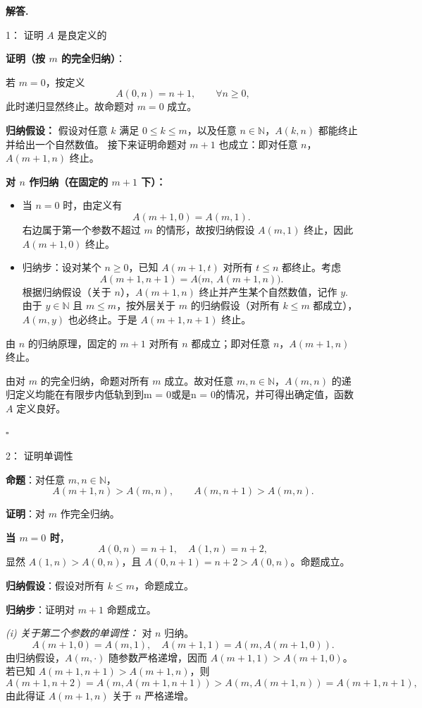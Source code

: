 \documentclass[12pt,a4paper,oneside]{ctexart}
\newenvironment{solution}{
    \addcontentsline{toc}{subsection}{解答}
    \noindent\textbf{解答. }
}{\par}
\begin{document}
\begin{solution}

\par 1： 证明 $A$ 是良定义的

\textbf{证明（按 $m$ 的完全归纳）}：

 若 $m=0$，按定义
\[
A(0,n)=n+1,\qquad \forall n\ge 0,
\]
此时递归显然终止。故命题对 $m=0$ 成立。

\textbf{归纳假设：} 假设对任意 $k$ 满足 $0\le k\le m$，以及任意 $n\in\mathbb{N}$，$A(k,n)$ 都能终止并给出一个自然数值。
接下来证明命题对 $m+1$ 也成立：即对任意 $n$，$A(m+1,n)$ 终止。

\textbf{对 $n$ 作归纳（在固定的 $m+1$ 下）：}

\begin{itemize}
  \item 当 $n=0$ 时，由定义有
    \[
    A(m+1,0)=A(m,1).
    \]
    右边属于第一个参数不超过 $m$ 的情形，故按归纳假设 $A(m,1)$ 终止，因此 $A(m+1,0)$ 终止。

  \item 归纳步：设对某个 $n\ge0$，已知 $A(m+1,t)$ 对所有 $t\le n$ 都终止。考虑
    \[
    A(m+1,n+1)=A\bigl(m,\,A(m+1,n)\bigr).
    \]
    根据归纳假设（关于 $n$），$A(m+1,n)$ 终止并产生某个自然数值，记作 $y$. 由于 $y\in\mathbb{N}$ 且 $m\le m$，按外层关于 $m$ 的归纳假设（对所有 $k\le m$ 都成立），$A(m,y)$ 也必终止。于是 $A(m+1,n+1)$ 终止。
\end{itemize}

由 $n$ 的归纳原理，固定的 $m+1$ 对所有 $n$ 都成立；即对任意 $n$，$A(m+1,n)$ 终止。

由对 $m$ 的完全归纳，命题对所有 $m$ 成立。故对任意 $m,n\in\mathbb{N}$，$A(m,n)$ 的递归定义均能在有限步内低轨到到m = 0或是n = 0的情况，并可得出确定值，函数 $A$ 定义良好。

\hfill$\square$

\par 2： 证明单调性

\textbf{命题}：对任意 $m,n\in\mathbb{N}$，
\[
A(m+1,n) > A(m,n), \qquad A(m,n+1) > A(m,n).
\]

\medskip
\textbf{证明}：对 $m$ 作完全归纳。

\textbf{当 $m=0$ 时}，
\[
A(0,n)=n+1,\quad A(1,n)=n+2,
\]
显然 $A(1,n)>A(0,n)$，且 $A(0,n+1)=n+2>A(0,n)$。命题成立。

\textbf{归纳假设}：假设对所有 $k\leq m$，命题成立。

\textbf{归纳步}：证明对 $m+1$ 命题成立。

\emph{(i) 关于第二个参数的单调性：}
对 $n$ 归纳。
\[
A(m+1,0)=A(m,1),\quad A(m+1,1)=A(m,A(m+1,0)).
\]
由归纳假设，$A(m,\cdot)$ 随参数严格递增，因而 $A(m+1,1)>A(m+1,0)$。  
若已知 $A(m+1,n+1)>A(m+1,n)$，则
\[
A(m+1,n+2)=A(m,A(m+1,n+1)) > A(m,A(m+1,n))=A(m+1,n+1),
\]
由此得证 $A(m+1,n)$ 关于 $n$ 严格递增。


\end{solution}
\end{document}
